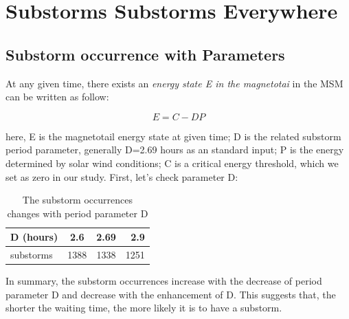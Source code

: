 \documentclass[12pt, letterpaper]{article} %
\begin{document}
\section{Substorms Substorms Everywhere} %
\subsection{Substorm occurrence with Parameters} %
At any given time, there exists an \textit{energy state E in the magnetotai} in the MSM can be written as follow:

\begin{equation} 
  E = C - DP
  \label{eq:1}  
\end{equation} %

here, E is the magnetotail energy state at given time; D is the related substorm period parameter, generally D=2.69 hours as an standard input; P is the energy determined by solar wind conditions; C is a critical energy threshold, which we set as zero in our study. First, let's check parameter D:

\begin{table}[!h] %
  \begin{center} %
  \begin{tabular}{|l|c|c|r|} %
    \hline %
    D (hours) & 2.6 & 2.69 &  2.9\\ %
    \hline %
    \hline %
    substorms & 1388 &1338 & 1251\\ %
    \hline %
  \end{tabular} %
  \caption{The substorm occurrences changes with period parameter D} %
  \label{tab:tab1} %
  \end{center} %
\end{table} %

In summary, the substorm occurrences increase with the decrease of period parameter D and decrease with the enhancement of D. This suggests that, the shorter the waiting time, the more likely it is to have a substorm. 
\end{document}
